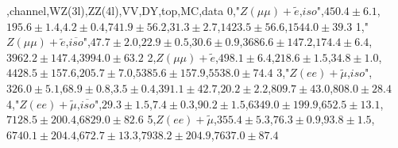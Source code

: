 ,channel,WZ(3l),ZZ(4l),VV,DY,top,MC,data
0,"$Z (\mu \mu)+\tilde{e}$,$iso$",$ 450.4 \pm    6.1$,$ 195.6 \pm    1.4$,$   4.2 \pm    0.4$,$ 741.9 \pm   56.2$,$  31.3 \pm    2.7$,$1423.5 \pm   56.6$,$1544.0 \pm   39.3$
1,"$Z (\mu \mu)+\tilde{e}$,$\overline{iso}$",$  47.7 \pm    2.0$,$  22.9 \pm    0.5$,$  30.6 \pm    0.9$,$3686.6 \pm  147.2$,$ 174.4 \pm    6.4$,$3962.2 \pm  147.4$,$3994.0 \pm   63.2$
2,$Z (\mu \mu)+\tilde{e}$,$ 498.1 \pm    6.4$,$ 218.6 \pm    1.5$,$  34.8 \pm    1.0$,$4428.5 \pm  157.6$,$ 205.7 \pm    7.0$,$5385.6 \pm  157.9$,$5538.0 \pm   74.4$
3,"$Z (e e)+\tilde{\mu}$,$iso$",$ 326.0 \pm    5.1$,$  68.9 \pm    0.8$,$   3.5 \pm    0.4$,$ 391.1 \pm   42.7$,$  20.2 \pm    2.2$,$ 809.7 \pm   43.0$,$ 808.0 \pm   28.4$
4,"$Z (e e)+\tilde{\mu}$,$\overline{iso}$",$  29.3 \pm    1.5$,$   7.4 \pm    0.3$,$  90.2 \pm    1.5$,$6349.0 \pm  199.9$,$ 652.5 \pm   13.1$,$7128.5 \pm  200.4$,$6829.0 \pm   82.6$
5,$Z (e e)+\tilde{\mu}$,$ 355.4 \pm    5.3$,$  76.3 \pm    0.9$,$  93.8 \pm    1.5$,$6740.1 \pm  204.4$,$ 672.7 \pm   13.3$,$7938.2 \pm  204.9$,$7637.0 \pm   87.4$
